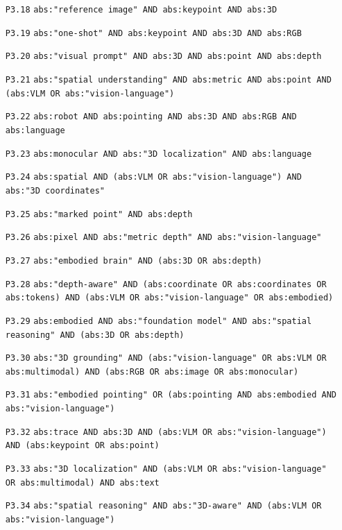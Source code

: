 {\begin{itemize}
\item[\texttt{P3.18}] \texttt{abs:"reference image" AND abs:keypoint AND abs:3D}
\item[\texttt{P3.19}] \texttt{abs:"one-shot" AND abs:keypoint AND abs:3D AND abs:RGB}
\item[\texttt{P3.20}] \texttt{abs:"visual prompt" AND abs:3D AND abs:point AND abs:depth}
\item[\texttt{P3.21}] \texttt{abs:"spatial understanding" AND abs:metric AND abs:point AND (abs:VLM OR abs:"vision-language")}
\item[\texttt{P3.22}] \texttt{abs:robot AND abs:pointing AND abs:3D AND abs:RGB AND abs:language}
\item[\texttt{P3.23}] \texttt{abs:monocular AND abs:"3D localization" AND abs:language}
\item[\texttt{P3.24}] \texttt{abs:spatial AND (abs:VLM OR abs:"vision-language") AND abs:"3D coordinates"}
\item[\texttt{P3.25}] \texttt{abs:"marked point" AND abs:depth}
\item[\texttt{P3.26}] \texttt{abs:pixel AND abs:"metric depth" AND abs:"vision-language"}
\item[\texttt{P3.27}] \texttt{abs:"embodied brain" AND (abs:3D OR abs:depth)}
\item[\texttt{P3.28}] \texttt{abs:"depth-aware" AND (abs:coordinate OR abs:coordinates OR abs:tokens) AND (abs:VLM OR abs:"vision-language" OR abs:embodied)}
\item[\texttt{P3.29}] \texttt{abs:embodied AND abs:"foundation model" AND abs:"spatial reasoning" AND (abs:3D OR abs:depth)}
\item[\texttt{P3.30}] \texttt{abs:"3D grounding" AND (abs:"vision-language" OR abs:VLM OR abs:multimodal) AND (abs:RGB OR abs:image OR abs:monocular)}
\item[\texttt{P3.31}] \texttt{abs:"embodied pointing" OR (abs:pointing AND abs:embodied AND abs:"vision-language")}
\item[\texttt{P3.32}] \texttt{abs:trace AND abs:3D AND (abs:VLM OR abs:"vision-language") AND (abs:keypoint OR abs:point)}
\item[\texttt{P3.33}] \texttt{abs:"3D localization" AND (abs:VLM OR abs:"vision-language" OR abs:multimodal) AND abs:text}
\item[\texttt{P3.34}] \texttt{abs:"spatial reasoning" AND abs:"3D-aware" AND (abs:VLM OR abs:"vision-language")}
\end{itemize}}

